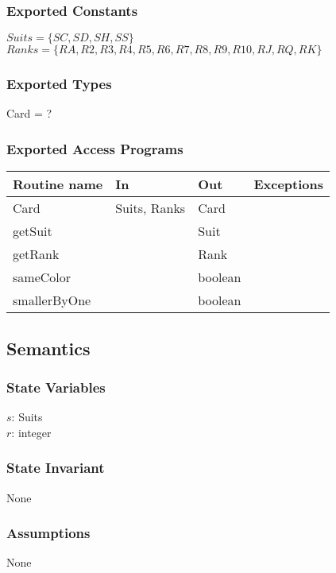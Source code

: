 \documentclass[12pt,fleqn]{article}
\begin{document}
\subsubsection* {Exported Constants}
$Suits = \{ SC, SD, SH, SS \}$\\
$Ranks = \{ RA, R2, R3, R4, R5, R6, R7, R8, R9, R10, RJ, RQ, RK \}$\\

\subsubsection* {Exported Types}
Card = ?


\subsubsection* {Exported Access Programs}

\begin{tabular}{| l | l | l | l |}
\hline
\textbf{Routine name} & \textbf{In} & \textbf{Out} & \textbf{Exceptions}\\
\hline
Card & Suits, Ranks  & Card & \\
\hline
getSuit & ~ & Suit & ~\\
\hline
getRank & ~ & Rank & ~\\
\hline
sameColor & ~ & boolean & ~\\
\hline
smallerByOne & ~ & boolean & ~\\

\hline 

\end{tabular}

\subsection* {Semantics}

\subsubsection* {State Variables}

$s$: Suits \\
$r$: integer\\
 

\subsubsection* {State Invariant}
None

\subsubsection* {Assumptions}
None
\end{document}
